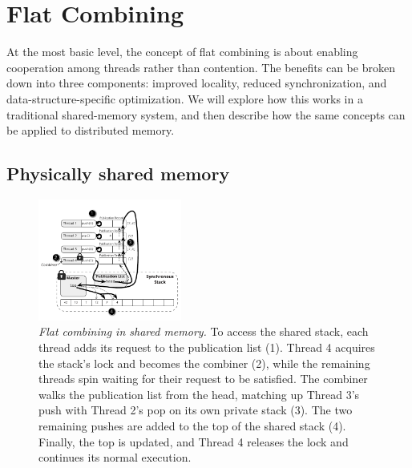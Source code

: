 \section{Flat Combining}

At the most basic level, the concept of flat combining is about enabling cooperation among threads rather than contention. The benefits can be broken down into three components: improved locality, reduced synchronization, and data-structure-specific optimization. We will explore how this works in a traditional shared-memory system, and then describe how the same concepts can be applied to distributed memory.


\subsection{Physically shared memory}

\begin{figure}[t]
  \centering
  \includegraphics[width=0.42\textwidth]{figs/fc_shared_mem.pdf}
  \caption{\emph{Flat combining in shared memory.}
    To access the shared stack, each thread adds its request to the publication list (1). Thread 4 acquires the stack's lock and becomes the combiner (2), while the remaining threads spin waiting for their request to be satisfied. The combiner walks the publication list from the head, matching up Thread 3's push with Thread 2's pop on its own private stack (3). The two remaining pushes are added to the top of the shared stack (4). Finally, the top is updated, and Thread 4 releases the lock and continues its normal execution.
  }
  \label{fig:fc_shared_mem}
\end{figure}


